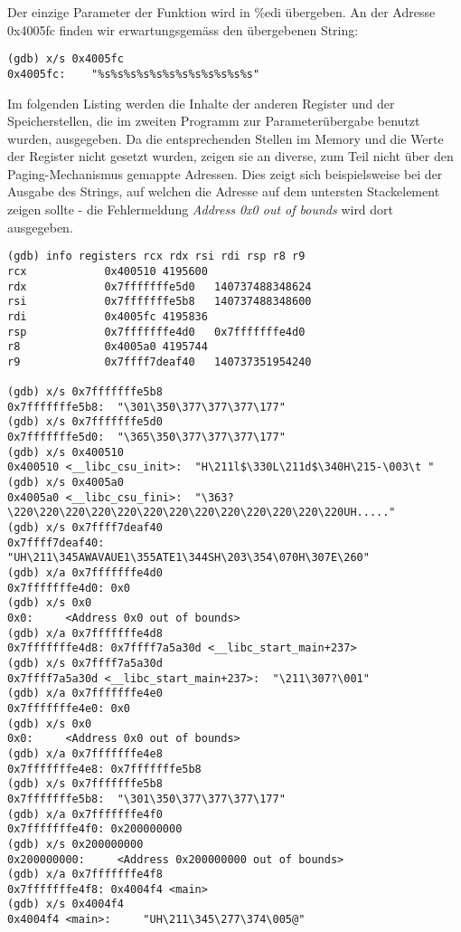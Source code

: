\documentclass[a4paper,11pt,parskip=half]{scrartcl}
\begin{document}
Der einzige Parameter der Funktion wird in \%edi übergeben. An der Adresse 0x4005fc finden wir erwartungsgemäss den übergebenen String:
\begin{lstlisting}
(gdb) x/s 0x4005fc
0x4005fc:	 "%s%s%s%s%s%s%s%s%s%s%s%s"
\end{lstlisting}

Im folgenden Listing werden die Inhalte der anderen Register und der Speicherstellen, die im zweiten Programm zur Parameterübergabe benutzt wurden, ausgegeben. Da die entsprechenden Stellen im Memory und die Werte der Register nicht gesetzt wurden, zeigen sie an diverse, zum Teil nicht über den Paging-Mechanismus gemappte Adressen. Dies zeigt sich beispielsweise bei der Ausgabe des \glqq{}Strings\grqq{}, auf welchen die Adresse auf dem untersten Stackelement zeigen sollte - die Fehlermeldung \emph{Address 0x0 out of bounds} wird dort ausgegeben.
\begin{lstlisting}
(gdb) info registers rcx rdx rsi rdi rsp r8 r9
rcx            0x400510	4195600
rdx            0x7fffffffe5d0	140737488348624
rsi            0x7fffffffe5b8	140737488348600
rdi            0x4005fc	4195836
rsp            0x7fffffffe4d0	0x7fffffffe4d0
r8             0x4005a0	4195744
r9             0x7ffff7deaf40	140737351954240

(gdb) x/s 0x7fffffffe5b8
0x7fffffffe5b8:	 "\301\350\377\377\377\177"
(gdb) x/s 0x7fffffffe5d0
0x7fffffffe5d0:	 "\365\350\377\377\377\177"
(gdb) x/s 0x400510
0x400510 <__libc_csu_init>:	 "H\211l$\330L\211d$\340H\215-\003\t "
(gdb) x/s 0x4005a0
0x4005a0 <__libc_csu_fini>:	 "\363?\220\220\220\220\220\220\220\220\220\220\220\220\220UH....."
(gdb) x/s 0x7ffff7deaf40
0x7ffff7deaf40:	 "UH\211\345AWAVAUE1\355ATE1\344SH\203\354\070H\307E\260"
(gdb) x/a 0x7fffffffe4d0
0x7fffffffe4d0:	0x0
(gdb) x/s 0x0
0x0:	 <Address 0x0 out of bounds>
(gdb) x/a 0x7fffffffe4d8
0x7fffffffe4d8:	0x7ffff7a5a30d <__libc_start_main+237>
(gdb) x/s 0x7ffff7a5a30d
0x7ffff7a5a30d <__libc_start_main+237>:	 "\211\307?\001"
(gdb) x/a 0x7fffffffe4e0
0x7fffffffe4e0:	0x0
(gdb) x/s 0x0
0x0:	 <Address 0x0 out of bounds>
(gdb) x/a 0x7fffffffe4e8
0x7fffffffe4e8:	0x7fffffffe5b8
(gdb) x/s 0x7fffffffe5b8
0x7fffffffe5b8:	 "\301\350\377\377\377\177"
(gdb) x/a 0x7fffffffe4f0
0x7fffffffe4f0:	0x200000000
(gdb) x/s 0x200000000
0x200000000:	 <Address 0x200000000 out of bounds>
(gdb) x/a 0x7fffffffe4f8
0x7fffffffe4f8:	0x4004f4 <main>
(gdb) x/s 0x4004f4
0x4004f4 <main>:	 "UH\211\345\277\374\005@"
\end{lstlisting}
\end{document}
